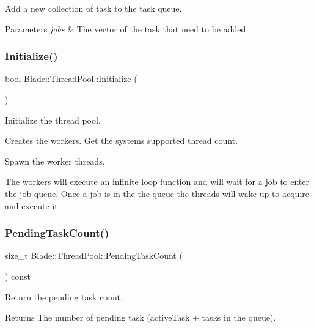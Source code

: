 Add a new collection of task to the task queue. 


\begin{DoxyParams}{Parameters}
{\em jobs} & The vector of the task that need to be added \\
\hline
\end{DoxyParams}
\mbox{\label{class_blade_1_1_thread_pool_a47f7b1929e59c4be260f1616a7340ca7}} 
\subsubsection{\texorpdfstring{Initialize()}{Initialize()}}
{\footnotesize\ttfamily bool Blade\+::\+Thread\+Pool\+::\+Initialize (\begin{DoxyParamCaption}{ }\end{DoxyParamCaption})}



Initialize the thread pool. 

Creates the workers. Get the system\textquotesingle{}s supported thread count.

Spawn the worker threads.

The workers will execute an infinite loop function and will wait for a job to enter the job queue. Once a job is in the the queue the threads will wake up to acquire and execute it.\mbox{\label{class_blade_1_1_thread_pool_af24597a7aa14bc296735f9f2d7d460df}} 
\subsubsection{\texorpdfstring{Pending\+Task\+Count()}{PendingTaskCount()}}
{\footnotesize\ttfamily size\+\_\+t Blade\+::\+Thread\+Pool\+::\+Pending\+Task\+Count (\begin{DoxyParamCaption}{ }\end{DoxyParamCaption}) const}



Return the pending task count. 

\begin{DoxyReturn}{Returns}
The number of pending task (active\+Task + tasks in the queue). 
\end{DoxyReturn}
\mbox{\label{class_blade_1_1_thread_pool_a30124532ff2e5e72c1d03ae9f6029b91}} 
